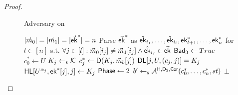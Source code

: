 \begin{proof}
\begin{figure*}
\begin{algobox}{Adversary \Bdv[1] on \sdh}
\begin{minipage}[t]{.49\linewidth}
\begin{algorithmic}
				\State \KwReq{} $\lvert\vec m_0\rvert = \lvert\vec m_1\rvert = \lvert\vec {{\mathsf{ek}}}^*\rvert = n$
				\State Parse $\vec{{\mathsf{ek}}}^*$ as $\hat{{\mathsf{ek}}}_{i_1},\ldots, \hat{{\mathsf{ek}}}_{i_l}, {\mathsf{ek}}_{l+1}^*,\ldots,{\mathsf{ek}}_n^*$
				for $l\in [n]$
				\State s.t. $\forall j\in[l]: \vec m_0[i_j] \neq \vec m_1[i_j]\wedge \hat{{\mathsf{ek}}}_{i_j} \in\vec{{\mathsf{ek}}}$
				\State ${\mathsf{Bad}}_3 \gets True$
				\State {}
				\EndIf
				\State $c_0^* \gets U$
				\State $K_j\gets_{\scriptscriptstyle\$} \mathcal{K}$
				\State $c_j^* \gets {\ensuremath{\mathsf{D}}}(K_j, \vec m_b[j])$
				\State ${\mathsf{DL}}[j, U, (c_j, j)] = K_j$
				\EndIf
				\State ${\mathsf{HL}}[U^{\alpha_j}, {\mathsf{ek}}^*[j], j] \gets K_j$
				\EndIf
				\EndFor
				\State ${\mathsf{Phase}} \gets 2$
				\State $b' \gets_{\scriptscriptstyle\$} \mathcal{A}_{\relax}^{{\mathsf{H}},{\mathsf{D}}_2,{\mathsf{Cor}}}(c_0^*,\ldots, c_n^*, st)$
				\State \Return $\bot$
			\end{algorithmic}
			

\end{minipage}
\end{algobox}
\end{figure*}
\end{proof}
